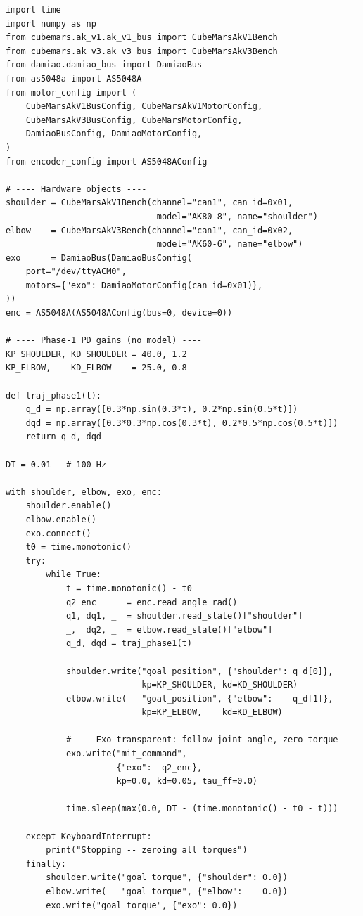 \documentclass[11pt,a4paper]{article}
\begin{document}
\begin{lstlisting}[caption={4-actuator Phase~1 loop: MIT PD + transparent exo.}]
import time
import numpy as np
from cubemars.ak_v1.ak_v1_bus import CubeMarsAkV1Bench
from cubemars.ak_v3.ak_v3_bus import CubeMarsAkV3Bench
from damiao.damiao_bus import DamiaoBus
from as5048a import AS5048A
from motor_config import (
    CubeMarsAkV1BusConfig, CubeMarsAkV1MotorConfig,
    CubeMarsAkV3BusConfig, CubeMarsMotorConfig,
    DamiaoBusConfig, DamiaoMotorConfig,
)
from encoder_config import AS5048AConfig

# ---- Hardware objects ----
shoulder = CubeMarsAkV1Bench(channel="can1", can_id=0x01,
                              model="AK80-8", name="shoulder")
elbow    = CubeMarsAkV3Bench(channel="can1", can_id=0x02,
                              model="AK60-6", name="elbow")
exo      = DamiaoBus(DamiaoBusConfig(
    port="/dev/ttyACM0",
    motors={"exo": DamiaoMotorConfig(can_id=0x01)},
))
enc = AS5048A(AS5048AConfig(bus=0, device=0))

# ---- Phase-1 PD gains (no model) ----
KP_SHOULDER, KD_SHOULDER = 40.0, 1.2
KP_ELBOW,    KD_ELBOW    = 25.0, 0.8

def traj_phase1(t):
    q_d = np.array([0.3*np.sin(0.3*t), 0.2*np.sin(0.5*t)])
    dqd = np.array([0.3*0.3*np.cos(0.3*t), 0.2*0.5*np.cos(0.5*t)])
    return q_d, dqd

DT = 0.01   # 100 Hz

with shoulder, elbow, exo, enc:
    shoulder.enable()
    elbow.enable()
    exo.connect()
    t0 = time.monotonic()
    try:
        while True:
            t = time.monotonic() - t0
            q2_enc      = enc.read_angle_rad()
            q1, dq1, _  = shoulder.read_state()["shoulder"]
            _,  dq2, _  = elbow.read_state()["elbow"]
            q_d, dqd = traj_phase1(t)

            shoulder.write("goal_position", {"shoulder": q_d[0]},
                           kp=KP_SHOULDER, kd=KD_SHOULDER)
            elbow.write(   "goal_position", {"elbow":    q_d[1]},
                           kp=KP_ELBOW,    kd=KD_ELBOW)

            # --- Exo transparent: follow joint angle, zero torque ---
            exo.write("mit_command",
                      {"exo":  q2_enc},
                      kp=0.0, kd=0.05, tau_ff=0.0)

            time.sleep(max(0.0, DT - (time.monotonic() - t0 - t)))

    except KeyboardInterrupt:
        print("Stopping -- zeroing all torques")
    finally:
        shoulder.write("goal_torque", {"shoulder": 0.0})
        elbow.write(   "goal_torque", {"elbow":    0.0})
        exo.write("goal_torque", {"exo": 0.0})
\end{lstlisting}
\end{document}
